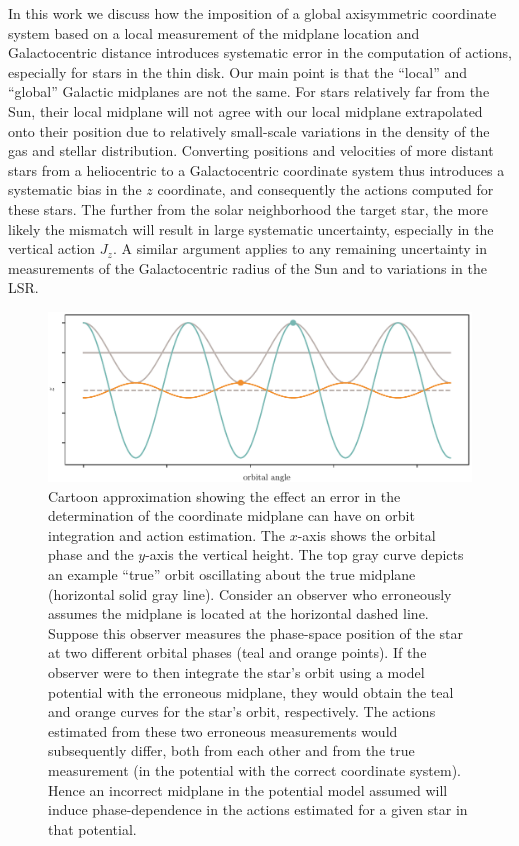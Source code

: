 \documentclass[twocolumn]{aastex62}
\begin{document}
In this work we discuss how the imposition of a global axisymmetric coordinate
system based on a local measurement of the midplane location and
Galactocentric distance introduces systematic error in the computation of
actions, especially for stars in the thin disk. Our main point is that the
``local'' and ``global'' Galactic
midplanes are not the same. For stars relatively far from the Sun, their local midplane
will not agree with our local midplane extrapolated onto their position due to
relatively small-scale variations in the density of the gas and stellar
distribution. Converting positions and velocities of more distant stars from a
heliocentric to a Galactocentric coordinate system thus introduces a systematic
bias in the $z$ coordinate, and consequently the actions computed for these stars.
The further from the solar neighborhood the target star, the more likely the
mismatch will result in large systematic uncertainty, especially in the
vertical action $J_z$. A similar argument applies to any remaining uncertainty
in measurements of the Galactocentric radius of the Sun and to variations in
the LSR.

\begin{figure}[ht!]
\begin{center}
\includegraphics[width=\textwidth]{fig/cartoon.pdf}
\end{center}
\caption{Cartoon approximation showing the effect an error in the
determination of the coordinate midplane can have on orbit integration and
action estimation. The $x$-axis shows the orbital phase and the $y$-axis the
vertical height. The top gray curve depicts an example ``true'' orbit
oscillating about the true midplane (horizontal solid gray line). Consider an
observer who erroneously assumes the midplane is located at the horizontal
dashed line. Suppose this observer measures the phase-space position of the
star at two different orbital phases (teal and orange points). If the observer
were to then integrate the star's orbit using a model potential with the
erroneous midplane, they would obtain the teal and orange curves for the
star's orbit, respectively. The actions estimated from these two erroneous
measurements would subsequently differ, both from each other and from the true measurement (in the potential with the correct coordinate system).
Hence an incorrect midplane in the potential model assumed will induce
phase-dependence in the actions estimated for a given star in that potential.}
\label{fig:cartoon}
\end{figure}
\end{document}
